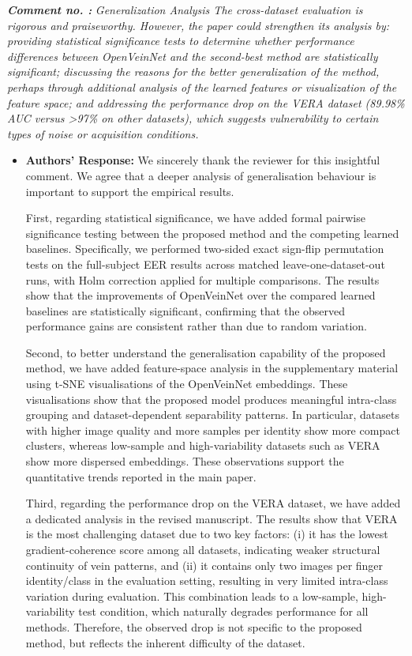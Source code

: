 \documentclass[11pt]{article}
\theoremstyle{remark}
\newcounter{mycounter} %
\newcommand\showReviewcounter{\stepcounter{mycounter}\themycounter}
\begin{document}
\color{blue} 
\textbf{\textit{Comment no. \showReviewcounter:}} 
\textit{Generalization Analysis
The cross-dataset evaluation is rigorous and praiseworthy. However, the paper could strengthen its analysis by: providing statistical significance tests to determine whether performance differences between OpenVeinNet and the second-best method are statistically significant; discussing the reasons for the better generalization of the method, perhaps through additional analysis of the learned features or visualization of the feature space; and addressing the performance drop on the VERA dataset (89.98\% AUC versus >97\% on other datasets), which suggests vulnerability to certain types of noise or acquisition conditions.}
\color{black}

\begin{itemize}
	\item \textbf{Authors' Response:} 
	We sincerely thank the reviewer for this insightful comment. We agree that a deeper analysis of generalisation behaviour is important to support the empirical results.

	First, regarding statistical significance, we have added formal pairwise significance testing between the proposed method and the competing learned baselines. Specifically, we performed two-sided exact sign-flip permutation tests on the full-subject EER results across matched leave-one-dataset-out runs, with Holm correction applied for multiple comparisons. The results show that the improvements of OpenVeinNet over the compared learned baselines are statistically significant, confirming that the observed performance gains are consistent rather than due to random variation.

	Second, to better understand the generalisation capability of the proposed method, we have added feature-space analysis in the supplementary material using t-SNE visualisations of the OpenVeinNet embeddings. These visualisations show that the proposed model produces meaningful intra-class grouping and dataset-dependent separability patterns. In particular, datasets with higher image quality and more samples per identity show more compact clusters, whereas low-sample and high-variability datasets such as VERA show more dispersed embeddings. These observations support the quantitative trends reported in the main paper.

	Third, regarding the performance drop on the VERA dataset, we have added a dedicated analysis in the revised manuscript. The results show that VERA is the most challenging dataset due to two key factors: (i) it has the lowest gradient-coherence score among all datasets, indicating weaker structural continuity of vein patterns, and (ii) it contains only two images per finger identity/class in the evaluation setting, resulting in very limited intra-class variation during evaluation. This combination leads to a low-sample, high-variability test condition, which naturally degrades performance for all methods. Therefore, the observed drop is not specific to the proposed method, but reflects the inherent difficulty of the dataset.


\end{itemize}
\end{document}
